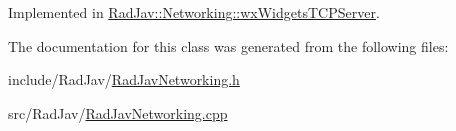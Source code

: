 Implemented in \hyperlink{class_rad_jav_1_1_networking_1_1wx_widgets_t_c_p_server_a173290e650c00590aca54c4833b5437d}{Rad\+Jav\+::\+Networking\+::wx\+Widgets\+T\+C\+P\+Server}.



The documentation for this class was generated from the following files\+:\begin{DoxyCompactItemize}
\item 
include/\+Rad\+Jav/\hyperlink{_rad_jav_networking_8h}{Rad\+Jav\+Networking.\+h}\item 
src/\+Rad\+Jav/\hyperlink{_rad_jav_networking_8cpp}{Rad\+Jav\+Networking.\+cpp}\end{DoxyCompactItemize}
